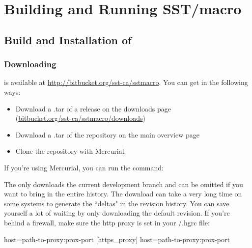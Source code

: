 
\chapter{Building and Running SST/macro}
\label{chapter:building}

\section{Build and Installation of \sstmacro}
\label{sec:buildinstall}


\subsection{Downloading}
\label{subsec:build:downloading}

\sstmacro is available at \url{http://bitbucket.org/sst-ca/sstmacro}.  You can get \sstmacro in the following ways:

\begin{itemize}
\item Download a .tar of a release on the downloads page  \\ 
(\url{bitbucket.org/sst-ca/sstmacro/downloads})
\item Download a .tar of the repository on the main overview page
\item Clone the repository with Mercurial. 
\end{itemize}


If you're using Mercurial, you can run the command:



The  only downloads the current development branch and can be omitted if you want to bring in the entire history.
The download can take a very long time on some systems to generate the ``deltas" in the revision history.
You can save yourself a lot of waiting by only downloading the default revision.
If you're behind a firewall, make sure the http proxy is set in your \mytilde/.hgrc file:

\begin{ViFile}
host=path-to-proxy:prox-port 
[https_proxy] 
host=path-to-proxy:prox-port 
\end{ViFile}


